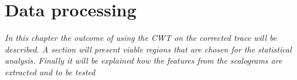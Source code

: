 \chapter{Data processing}
\textit{In this chapter the outcome of using the CWT on the corrected trace will be described. A section will present viable regions that are chosen for the statistical analysis. Finally it will be explained how the features from the scalograms are extracted and to be tested } 